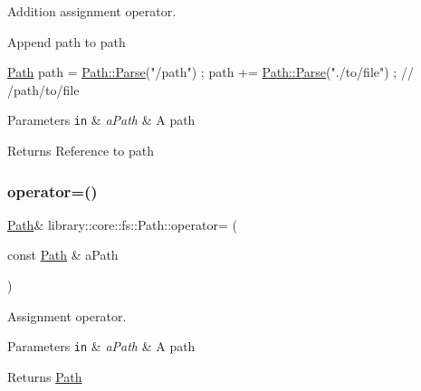 Addition assignment operator. 

Append path to path


\begin{DoxyCode}
\hyperlink{classlibrary_1_1core_1_1fs_1_1Path_aaba9a8e0153813f08f78f1c3275734a4}{Path} path = \hyperlink{classlibrary_1_1core_1_1fs_1_1Path_aebf5bd3af83e0b7376616e146f3e55df}{Path::Parse}(\textcolor{stringliteral}{"/path"}) ;
path += \hyperlink{classlibrary_1_1core_1_1fs_1_1Path_aebf5bd3af83e0b7376616e146f3e55df}{Path::Parse}(\textcolor{stringliteral}{"./to/file"}) ; \textcolor{comment}{// /path/to/file}
\end{DoxyCode}



\begin{DoxyParams}[1]{Parameters}
\mbox{\tt in}  & {\em a\+Path} & A path \\
\hline
\end{DoxyParams}
\begin{DoxyReturn}{Returns}
Reference to path 
\end{DoxyReturn}
\mbox{\label{classlibrary_1_1core_1_1fs_1_1Path_a138827134fbe96f732c5708a6a331f89}} 
\subsubsection{\texorpdfstring{operator=()}{operator=()}}
{\footnotesize\ttfamily \hyperlink{classlibrary_1_1core_1_1fs_1_1Path}{Path}\& library\+::core\+::fs\+::\+Path\+::operator= (\begin{DoxyParamCaption}\item[{const \hyperlink{classlibrary_1_1core_1_1fs_1_1Path}{Path} \&}]{a\+Path }\end{DoxyParamCaption})}



Assignment operator. 


\begin{DoxyParams}[1]{Parameters}
\mbox{\tt in}  & {\em a\+Path} & A path \\
\hline
\end{DoxyParams}
\begin{DoxyReturn}{Returns}
\hyperlink{classlibrary_1_1core_1_1fs_1_1Path}{Path} 
\end{DoxyReturn}
\mbox{\label{classlibrary_1_1core_1_1fs_1_1Path_add705556eb4509ab2868e322490a1e35}} 
